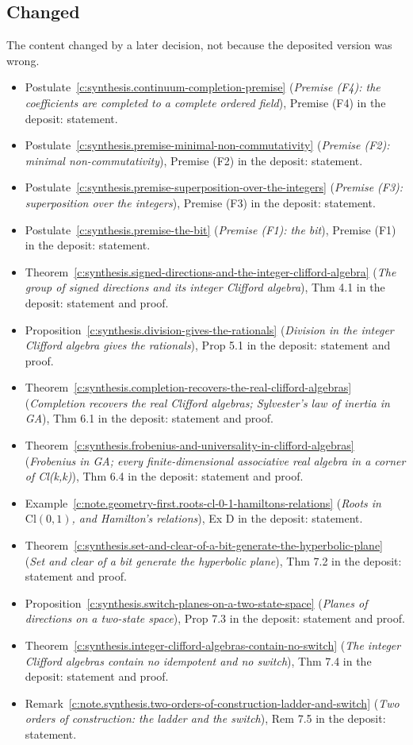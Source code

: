 \documentclass[11pt]{article}
\theoremstyle{definition}
\theoremstyle{plain}
\providecommand{\Cl}{}\renewcommand{\Cl}{\mathrm{Cl}}
\begin{document}
\subsection*{Changed}
The content changed by a later decision, not because the deposited version was wrong.
\begin{itemize}\setlength{\itemsep}{2pt}
\item Postulate~\ref{c:synthesis.continuum-completion-premise} (\emph{Premise (F4): the coefficients are completed to a complete ordered field}), Premise (F4) in the deposit: statement.
\item Postulate~\ref{c:synthesis.premise-minimal-non-commutativity} (\emph{Premise (F2): minimal non-commutativity}), Premise (F2) in the deposit: statement.
\item Postulate~\ref{c:synthesis.premise-superposition-over-the-integers} (\emph{Premise (F3): superposition over the integers}), Premise (F3) in the deposit: statement.
\item Postulate~\ref{c:synthesis.premise-the-bit} (\emph{Premise (F1): the bit}), Premise (F1) in the deposit: statement.
\item Theorem~\ref{c:synthesis.signed-directions-and-the-integer-clifford-algebra} (\emph{The group of signed directions and its integer Clifford algebra}), Thm 4.1 in the deposit: statement and proof.
\item Proposition~\ref{c:synthesis.division-gives-the-rationals} (\emph{Division in the integer Clifford algebra gives the rationals}), Prop 5.1 in the deposit: statement and proof.
\item Theorem~\ref{c:synthesis.completion-recovers-the-real-clifford-algebras} (\emph{Completion recovers the real Clifford algebras; Sylvester's law of inertia in GA}), Thm 6.1 in the deposit: statement and proof.
\item Theorem~\ref{c:synthesis.frobenius-and-universality-in-clifford-algebras} (\emph{Frobenius in GA; every finite-dimensional associative real algebra in a corner of Cl(k,k)}), Thm 6.4 in the deposit: statement and proof.
\item Example~\ref{c:note.geometry-first.roots-cl-0-1-hamiltons-relations} (\emph{Roots in $\Cl(0,1)$, and Hamilton's relations}), Ex D in the deposit: statement.
\item Theorem~\ref{c:synthesis.set-and-clear-of-a-bit-generate-the-hyperbolic-plane} (\emph{Set and clear of a bit generate the hyperbolic plane}), Thm 7.2 in the deposit: statement and proof.
\item Proposition~\ref{c:synthesis.switch-planes-on-a-two-state-space} (\emph{Planes of directions on a two-state space}), Prop 7.3 in the deposit: statement and proof.
\item Theorem~\ref{c:synthesis.integer-clifford-algebras-contain-no-switch} (\emph{The integer Clifford algebras contain no idempotent and no switch}), Thm 7.4 in the deposit: statement and proof.
\item Remark~\ref{c:note.synthesis.two-orders-of-construction-ladder-and-switch} (\emph{Two orders of construction: the ladder and the switch}), Rem 7.5 in the deposit: statement.
\end{itemize}
\end{document}
